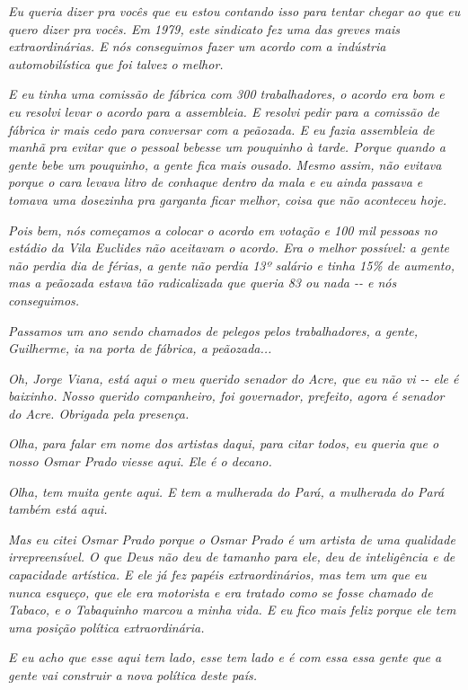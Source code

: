 \emph{Eu queria dizer pra vocês que eu estou contando isso para tentar
chegar ao que eu quero dizer pra vocês. Em 1979, este sindicato fez uma
das greves mais extraordinárias. E nós conseguimos fazer um acordo com a
indústria automobilística que foi talvez o melhor.}

\emph{E eu tinha uma comissão de fábrica com 300 trabalhadores, o acordo
era bom e eu resolvi levar o acordo para a assembleia. E resolvi pedir
para a comissão de fábrica ir mais cedo para conversar com a peãozada. E
eu fazia assembleia de manhã pra evitar que o pessoal bebesse um
pouquinho à tarde. Porque quando a gente bebe um pouquinho, a gente fica
mais ousado. Mesmo assim, não evitava porque o cara levava litro de
conhaque dentro da mala e eu ainda passava e tomava uma dosezinha pra
garganta ficar melhor, coisa que não aconteceu hoje.}

\emph{Pois bem, nós começamos a colocar o acordo em votação e 100 mil
pessoas no estádio da Vila Euclides não aceitavam o acordo. Era o melhor
possível: a gente não perdia dia de férias, a gente não perdia 13º
salário e tinha 15\% de aumento, mas a peãozada estava tão radicalizada
que queria 83 ou nada -\/- e nós conseguimos.~}

\emph{Passamos um ano sendo chamados de pelegos pelos trabalhadores, a
gente, Guilherme, ia na porta de fábrica, a peãozada...}

\emph{Oh, Jorge Viana, está aqui o meu querido senador do Acre, que eu
não vi -\/- ele é baixinho. Nosso querido companheiro, foi governador,
prefeito, agora é senador do Acre. Obrigada pela presença.~}

\emph{Olha, para falar em nome dos artistas daqui, para citar todos, eu
queria que o nosso Osmar Prado viesse aqui. Ele é o decano.}

\emph{Olha, tem muita gente aqui. E tem a mulherada do Pará, a mulherada
do Pará também está aqui.~}

\emph{Mas eu citei Osmar Prado porque o Osmar Prado é um artista de uma
qualidade irrepreensível. O que Deus não deu de tamanho para ele, deu de
inteligência e de capacidade artística. E ele já fez papéis
extraordinários, mas tem um que eu nunca esqueço, que ele era motorista
e era tratado como se fosse chamado de Tabaco, e o Tabaquinho marcou a
minha vida. E eu fico mais feliz porque ele tem uma posição política
extraordinária.~}

\emph{E eu acho que esse aqui tem lado, esse tem lado e é com essa essa
gente que a gente vai construir a nova política deste país.~}

